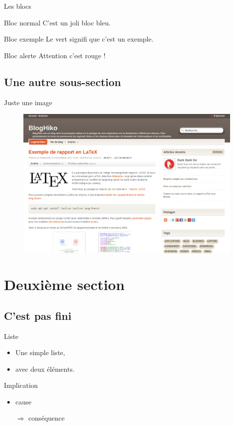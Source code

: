 \documentclass[utf8,compress]{beamer}
\begin{document}
\begin{frame}[containsverbatim]{Les blocs}
\begin{block}{Bloc normal}
     C'est un joli bloc bleu.
\end{block}
\begin{exampleblock}{Bloc exemple}
     Le vert signifi que c'est un exemple.
\end{exampleblock}
\begin{alertblock}{Bloc alerte}
     Attention c'est rouge !
\end{alertblock}
\end{frame}

\subsection{Une autre sous-section}

\begin{frame}{Juste une image}
\begin{figure}[h]
    \center
    \includegraphics[width=\textwidth]{bloghiko.png}
\end{figure}
\end{frame}


\section{Deuxième section}

\subsection{C'est pas fini}

\begin{frame}{Liste}
\begin{itemize}
    \item Une simple liste,
    \item avec deux éléments.
\end{itemize}
\begin{block}{Implication}
    \begin{itemize}
    \item cause
    \item[$\Rightarrow$] conséquence
    \end{itemize}
\end{block}
\end{frame}
\end{document}
